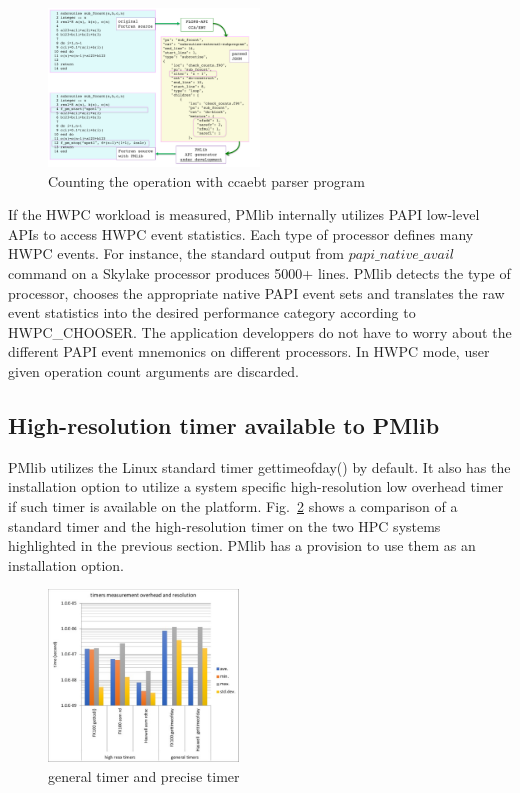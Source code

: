\documentclass[conference]{IEEEtran}
\begin{document}
\begin{figure}[tb]
\centering
\includegraphics[width=0.5\textwidth]{figs/ccaebt4PMlib.pdf}
\caption{Counting the operation with ccaebt parser program}
\label{fig:ccaebt4PMlib}
\end{figure}

If the HWPC workload is measured,
PMlib internally utilizes PAPI low-level APIs to access HWPC event statistics.
Each type of processor defines many HWPC events.
For instance, the standard output from $ papi\_native\_avail $ command on a
Skylake processor produces 5000+ lines.
PMlib detects the type of processor,
chooses the appropriate native PAPI event sets
and translates the raw event statistics into the desired
performance category according to HWPC\_CHOOSER.
The application developpers do not have to worry about
the different PAPI event mnemonics on different processors.
In HWPC mode, user given operation count arguments are discarded.

\subsection{High-resolution timer available to PMlib}
PMlib utilizes the Linux standard timer gettimeofday() by default.
It also has the installation option to utilize
a system specific high-resolution low overhead timer if such timer is
available on the platform.
Fig.~\ref{fig:precise-timer} shows a comparison of a standard timer and
the high-resolution timer on the two HPC systems highlighted in the
previous section.
PMlib has a provision to use them as an installation option.
\begin{figure}[tb]
\centering
\includegraphics[width=0.45\textwidth]{figs/precise-timer.pdf}
\caption{general timer and precise timer}
\label{fig:precise-timer}
\end{figure}
\end{document}
